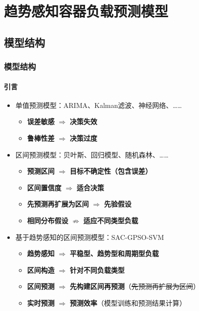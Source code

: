 \section{趋势感知容器负载预测模型}

\subsection{模型结构}

\begin{frame}
\frametitle{模型结构}
\framesubtitle{引言}
\begin{itemize}
    \item 单值预测模型：ARIMA、Kalman滤波、神经网络、……
    \begin{itemize}
        \item \textbf{误差敏感} $\Rightarrow$ \textbf{决策失效}
        \item \textbf{鲁棒性差} $\Rightarrow$ \textbf{决策过度}
    \end{itemize}
    \item 区间预测模型：贝叶斯、回归模型、随机森林、……
    \begin{itemize}
        \item \textbf{预测区间} $\Rightarrow$ \textbf{目标不确定性（包含误差）}
        \item \textbf{区间置信度} $\Rightarrow$ \textbf{适合决策}
        \item \alert{\textbf{先预测再扩展为区间} $\Rightarrow$ \textbf{先验假设}}
        \item \alert{\textbf{相同分布假设} $\nRightarrow$ \textbf{适应不同类型负载}}
    \end{itemize}
    \item 基于趋势感知的区间预测模型：SAC-GPSO-SVM
    \begin{itemize}
        \item \textbf{趋势感知} $\Rightarrow$ \textbf{平稳型、趋势型和周期型负载}
        \item \textbf{区间构造} $\Rightarrow$ \textbf{针对不同负载类型}
        \item \textbf{区间预测} $\Rightarrow$ \textbf{先构建区间再预测}（\sout{先预测再扩展为区间}）
        \item \textbf{实时预测} $\Rightarrow$ \textbf{预测效率}（模型训练和预测结果计算）
    \end{itemize}
\end{itemize}
\end{frame}


